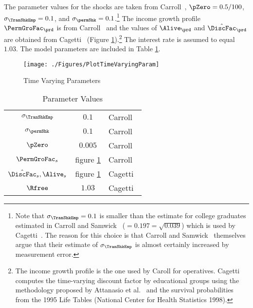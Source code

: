\documentclass[\econtexRoot/SolvingMicroDSOPs]{subfiles}
\begin{document}
The parameter values for the shocks are taken from Carroll~\citeyearpar{carroll:brookings}, $\pZero=0.5/100$, $\sigma _{\TranShkEmp }=0.1$, and $\sigma_{\permShk}=0.1$.\footnote{Note that $\sigma _{\TranShkEmp}=0.1$ is smaller than the estimate for college graduates estimated in
  Carroll and Samwick~\citeyearpar{carroll&samwick:nature} ($=0.197=\sqrt{0.039}$) which is used by Cagetti~\citeyearpar{cagettiWprofiles}. The reason for this choice is that Carroll and Samwick~\citeyearpar{carroll&samwick:nature} themselves argue that their estimate of $\sigma_{\TranShkEmp }$ is almost certainly increased by measurement error.} The income growth profile $\PermGroFac_{\prd}$ is from Carroll~\citeyearpar{carrollBSLCPIH} and the values of $\Alive_{\prd}$ and $\hat{\DiscFac}_{\prd}$ are obtained from Cagetti~\citeyearpar{cagettiWprofiles} (Figure \ref{fig:TimeVaryingParam}).\footnote{The income growth profile is the one used by Caroll for operatives. Cagetti computes the time-varying discount factor by educational groups using the methodology proposed by Attanasio et al.~\citeyearpar{AttanasioBanksMeghirWeber} and the survival probabilities from the 1995 Life Tables (National Center for Health Statistics 1998).} The interest rate is assumed to equal $1.03$. The model parameters are included in Table \ref{table:StrEstParams}.

\hypertarget{PlotTimeVaryingParam}{}
\begin{figure}[h]
  \texttt{[image: ./Figures/PlotTimeVaryingParam]}
  \caption{Time Varying Parameters}
  \label{fig:TimeVaryingParam}
\end{figure}

\begin{table}[h]
  \caption{Parameter Values}\label{table:StrEstParams}
  \begin{center}
    \begin{tabular}{ccl}
      \hline\hline
      $\sigma _{\TranShkEmp}$    & $0.1$ & Carroll~\citeyearpar{carroll:brookings}
      \\ $\sigma _{\permShk}$   & $0.1$ & Carroll~\citeyearpar{carroll:brookings}
      \\ $\pZero$           & $0.005$  & Carroll~\citeyearpar{carroll:brookings}
      \\ $\PermGroFac_{s}$        & figure \ref{fig:TimeVaryingParam} & Carroll~\citeyearpar{carrollBSLCPIH}
      \\ $\hat{\DiscFac}_{s},\Alive_{s}$ & figure \ref{fig:TimeVaryingParam} & Cagetti~\citeyearpar{cagettiWprofiles}
      \\$\Rfree$            & $1.03$  & Cagetti~\citeyearpar{cagettiWprofiles}\\
      \hline
    \end{tabular}
  \end{center}
\end{table}
\end{document}
